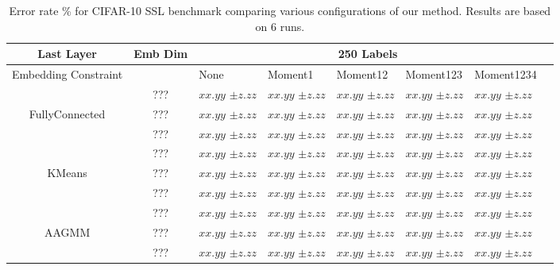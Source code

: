 \documentclass[10pt,twocolumn,letterpaper]{article}
\begin{document}
\begin{table*}[ht!]
\begin{tabularx}{\textwidth}{c|c|XXXXXX}
		\hline\hline
		 Last Layer  &   Emb Dim  & \multicolumn{5}{c}{250 Labels}            \\ \hline
		\multicolumn{1}{c|}{Embedding Constraint} &  & None & Moment1 & Moment12 & Moment123 & Moment1234  \\ \hline
		 & ???   & $xx.yy$ \scriptsize{$\pm z.zz$}   & $xx.yy$ \scriptsize{$\pm z.zz$} & $xx.yy$ \scriptsize{$\pm z.zz$} & $xx.yy$ \scriptsize{$\pm z.zz$} & $xx.yy$ \scriptsize{$\pm z.zz$}  \\
		FullyConnected & ???   & $xx.yy$ \scriptsize{$\pm z.zz$}   & $xx.yy$ \scriptsize{$\pm z.zz$} & $xx.yy$ \scriptsize{$\pm z.zz$} & $xx.yy$ \scriptsize{$\pm z.zz$} & $xx.yy$ \scriptsize{$\pm z.zz$}  \\
		 & ???   & $xx.yy$ \scriptsize{$\pm z.zz$}   & $xx.yy$ \scriptsize{$\pm z.zz$} & $xx.yy$ \scriptsize{$\pm z.zz$} & $xx.yy$ \scriptsize{$\pm z.zz$} & $xx.yy$ \scriptsize{$\pm z.zz$}  \\
		 \hline
		  & ??? & $xx.yy$ \scriptsize{$\pm z.zz$}    & $xx.yy$ \scriptsize{$\pm z.zz$} & $xx.yy$ \scriptsize{$\pm z.zz$} & $xx.yy$ \scriptsize{$\pm z.zz$} & $xx.yy$ \scriptsize{$\pm z.zz$}  \\
		KMeans  & ??? & $xx.yy$ \scriptsize{$\pm z.zz$}    & $xx.yy$ \scriptsize{$\pm z.zz$} & $xx.yy$ \scriptsize{$\pm z.zz$} & $xx.yy$ \scriptsize{$\pm z.zz$} & $xx.yy$ \scriptsize{$\pm z.zz$}  \\
		  & ??? & $xx.yy$ \scriptsize{$\pm z.zz$}    & $xx.yy$ \scriptsize{$\pm z.zz$} & $xx.yy$ \scriptsize{$\pm z.zz$} & $xx.yy$ \scriptsize{$\pm z.zz$} & $xx.yy$ \scriptsize{$\pm z.zz$}  \\
		  \hline
		 & ???   & $xx.yy$ \scriptsize{$\pm z.zz$}    & $xx.yy$ \scriptsize{$\pm z.zz$}& $xx.yy$ \scriptsize{$\pm z.zz$} & $xx.yy$ \scriptsize{$\pm z.zz$} & $xx.yy$ \scriptsize{$\pm z.zz$}  \\
		AAGMM & ???   & $xx.yy$ \scriptsize{$\pm z.zz$}    & $xx.yy$ \scriptsize{$\pm z.zz$}& $xx.yy$ \scriptsize{$\pm z.zz$} & $xx.yy$ \scriptsize{$\pm z.zz$} & $xx.yy$ \scriptsize{$\pm z.zz$}  \\
		 & ???   & $xx.yy$ \scriptsize{$\pm z.zz$}    & $xx.yy$ \scriptsize{$\pm z.zz$}& $xx.yy$ \scriptsize{$\pm z.zz$} & $xx.yy$ \scriptsize{$\pm z.zz$} & $xx.yy$ \scriptsize{$\pm z.zz$}  \\
	\end{tabularx}
	\caption{Error rate \% for CIFAR-10 SSL benchmark comparing various configurations of our method. Results are based on 6 runs.}
	\label{table1}
	
\end{table*}
\end{document}
